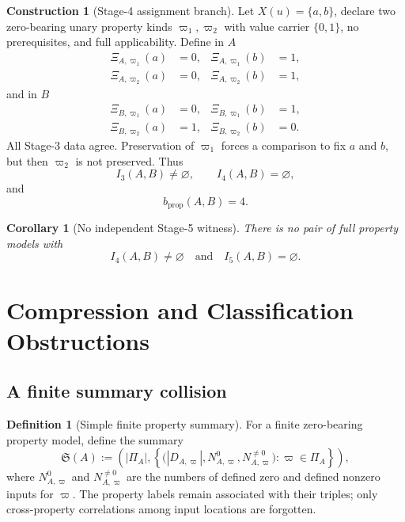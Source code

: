 \documentclass[11pt]{article}
\newtheorem{corollary}[theorem]{Corollary}
\theoremstyle{definition}
\newtheorem{definition}[theorem]{Definition}
\newtheorem{construction}[theorem]{Construction}
\theoremstyle{remark}
\begin{document}
\begin{construction}[Stage-4 assignment branch]
Let \(X(u)=\{a,b\}\), declare two zero-bearing unary property kinds \(\varpi_1,\varpi_2\) with value carrier \(\{0,1\}\), no prerequisites, and full applicability.
Define in \(A\)
\[
\begin{aligned}
\Xi_{A,\varpi_1}(a)&=0,&\Xi_{A,\varpi_1}(b)&=1,\\
\Xi_{A,\varpi_2}(a)&=0,&\Xi_{A,\varpi_2}(b)&=1,
\end{aligned}
\]
and in \(B\)
\[
\begin{aligned}
\Xi_{B,\varpi_1}(a)&=0,&\Xi_{B,\varpi_1}(b)&=1,\\
\Xi_{B,\varpi_2}(a)&=1,&\Xi_{B,\varpi_2}(b)&=0.
\end{aligned}
\]
All Stage-3 data agree.
Preservation of \(\varpi_1\) forces a comparison to fix \(a\) and \(b\), but then \(\varpi_2\) is not preserved.
Thus
\[
I_3(A,B)\neq\varnothing,
\qquad
I_4(A,B)=\varnothing,
\]
and
\[
b_{\mathrm{prop}}(A,B)=4.
\]
\end{construction}

\begin{corollary}[No independent Stage-5 witness]
There is no pair of full property models with
\[
I_4(A,B)\neq\varnothing
\quad\text{and}\quad
I_5(A,B)=\varnothing.
\]
\end{corollary}

\section{Compression and Classification Obstructions}
\label{sec:compression}

\subsection{A finite summary collision}

\begin{definition}[Simple finite property summary]
For a finite zero-bearing property model, define the summary
\[
\mathfrak S(A):=
\left(
|\Pi_A|,
\left\{
\bigl(|D_{A,\varpi}|,N^0_{A,\varpi},N^{\neq0}_{A,\varpi}\bigr)
:\varpi\in\Pi_A
\right\}
\right),
\]
where \(N^0_{A,\varpi}\) and \(N^{\neq0}_{A,\varpi}\) are the numbers of defined zero and defined nonzero inputs for \(\varpi\).
The property labels remain associated with their triples; only cross-property correlations among input locations are forgotten.
\end{definition}
\end{document}
